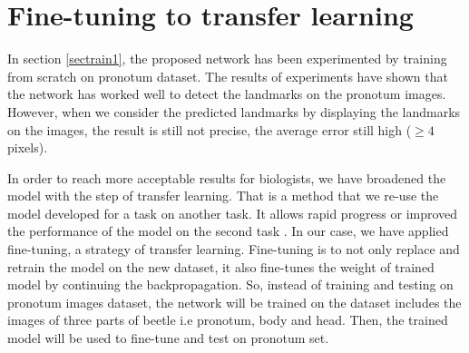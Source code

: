 \documentclass[10pt]{article}
\begin{document}
\section{Fine-tuning to transfer learning}
\label{secimproving}
In section \ref{sectrain1}, the proposed network has been experimented by training from scratch on pronotum dataset. The results of experiments have shown that the network has worked well to detect the landmarks on the pronotum images. However, when we consider the predicted landmarks by displaying the landmarks on the images, the result is still not precise, the average error still high ($\geq 4$ pixels). 

In order to reach more acceptable results for biologists, we have broadened the model with the step of transfer learning. That is a method that we re-use the model developed for a task on another task. It allows rapid progress or improved the performance of the model on the second task \cite{torrey2009transfer}. In our case, we have applied fine-tuning, a strategy of transfer learning. Fine-tuning is to not only replace and retrain the model on the new dataset, it also fine-tunes the weight of trained model by continuing the backpropagation. So, instead of training and testing on pronotum images dataset, the network will be trained on the dataset includes the images of three parts of beetle i.e pronotum, body and head. Then, the trained model will be used to fine-tune and test on pronotum set.


\end{document}
